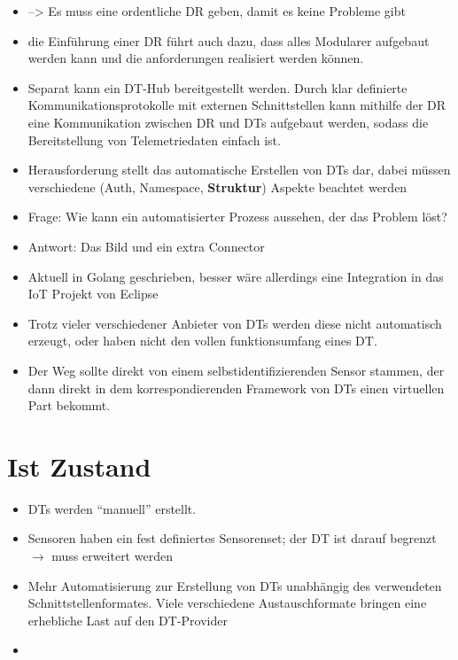 \begin{itemize}
    \item --> Es muss eine ordentliche DR geben, damit es keine Probleme gibt
    \item die Einführung einer DR führt auch dazu, dass alles Modularer aufgebaut werden kann und die anforderungen realisiert werden können.
    \item Separat kann ein DT-Hub bereitgestellt werden. Durch klar definierte Kommunikationsprotokolle mit externen Schnittstellen kann mithilfe der DR eine Kommunikation zwischen DR und DTs aufgebaut werden, sodass die Bereitstellung von Telemetriedaten einfach ist.
    \item Herausforderung stellt das automatische Erstellen von DTs dar, dabei müssen verschiedene (Auth, Namespace, \textbf{Struktur}) Aspekte beachtet werden
    \item Frage: Wie kann ein automatisierter Prozess aussehen, der das Problem löst?
    \item Antwort: Das Bild und ein extra Connector
    \item Aktuell in Golang geschrieben, besser wäre allerdings eine Integration in das IoT Projekt von Eclipse
\end{itemize}

\begin{itemize}
    \item Trotz vieler verschiedener Anbieter von DTs werden diese nicht automatisch erzeugt, oder haben nicht den vollen funktionsumfang eines DT.
    \item Der Weg sollte direkt von einem selbstidentifizierenden Sensor stammen, der dann direkt in dem korrespondierenden Framework von DTs einen virtuellen Part bekommt.
\end{itemize}

\section{Ist Zustand}

\begin{itemize}
    \item DTs werden \enquote{manuell} erstellt.
    \item Sensoren haben ein fest definiertes Sensorenset; der DT ist darauf begrenzt $\rightarrow$ muss erweitert werden
    \item Mehr Automatisierung zur Erstellung von DTs unabhängig des verwendeten Schnittstellenformates. Viele verschiedene Austauschformate bringen eine erhebliche Last auf den DT-Provider
    \item 
\end{itemize}